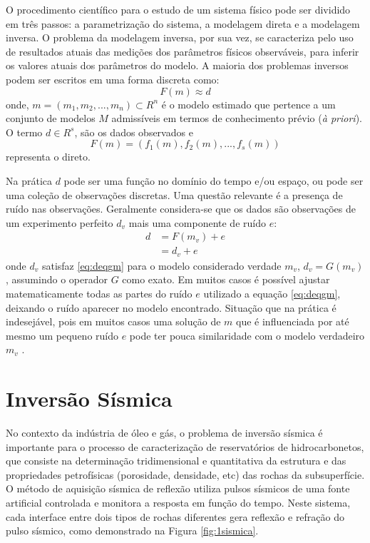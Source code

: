O procedimento científico para o estudo de um sistema físico pode ser dividido
em três passos: a parametrização do sistema, a  modelagem direta e a modelagem inversa.
O problema da modelagem inversa, por sua vez, se caracteriza pelo
uso de resultados atuais das medições dos parâmetros físicos observáveis, para inferir os valores atuais dos
parâmetros do modelo. A maioria dos problemas inversos podem ser escritos em uma forma discreta como:
\begin{equation}
\label{eq:deqgm}
F(m) \approx d 
\end{equation}
onde, $m=(m_1, m_2,...,m_n) \subset R^n$ é o modelo estimado que pertence a um conjunto de modelos $M$ admissíveis
em termos de conhecimento prévio (\textit{à priori}). O termo $d \in R^s$, são os dados observados e
\begin{equation}F(m)=(f_1(m),f_2(m),...,f_s(m))\end{equation} representa o direto.

Na prática $d$ pode ser uma função no domínio do tempo e/ou espaço, ou pode ser
uma coleção de observações discretas. Uma questão relevante é a presença de
ruído nas observações. Geralmente considera-se que os dados são observações
de um experimento perfeito $d_v$ mais uma componente de ruído $e$:
\begin{equation}
\begin{split}
d &= F(m_v) + e \\
&= d_v + e
\end{split}
\end{equation}
onde $d_v$ satisfaz  \ref{eq:deqgm} para o modelo considerado verdade $m_v$, 
$d_v = G(m_v)$, assumindo o operador $G$ como exato. Em muitos casos é possível
ajustar matematicamente todas as partes do ruído $e$ utilizado a equação \ref{eq:deqgm},
deixando o ruído aparecer no modelo encontrado. Situação que na prática é
indesejável, pois em muitos casos uma solução de $m$ que é influenciada por até
mesmo um pequeno ruído $e$ pode ter pouca similaridade com o modelo verdadeiro
$m_v$ \citep[p. 19]{aster2013parameter}.

\section{Inversão Sísmica}

No contexto da indústria de óleo e gás, o problema de inversão sísmica é
importante para o processo de caracterização de reservatórios de
hidrocarbonetos, que consiste na determinação tridimensional e quantitativa da
estrutura e das propriedades petrofísicas (porosidade, densidade, etc) das
rochas da subsuperfície. O método de aquisição sísmica de reflexão utiliza
pulsos sísmicos de uma fonte artificial controlada e monitora a resposta em
função do tempo. Neste sistema, cada interface entre dois tipos de rochas
diferentes gera reflexão e refração do pulso sísmico, como demonstrado na Figura
\ref{fig:1sismica}.

